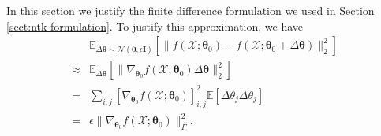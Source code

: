 \documentclass{article} %
\begin{document}
In this section we justify the finite difference formulation we used in Section \ref{sect:ntk-formulation}. To justify this approximation, we have 
\begin{align*}
& \mathbb{E}_{\Delta \boldsymbol{\theta} \sim \mathcal{N}(\textbf{0},\epsilon\textbf{I})}\left[\|f(\mathcal{X};\boldsymbol{\theta}_0)-f(\mathcal{X};\boldsymbol{\theta}_0+\Delta\boldsymbol{\theta})\|_2^2\right] \\
\approx & \mathbb{E}_{\Delta\boldsymbol{\theta}}\left[\|\nabla_{\boldsymbol{\theta}_0}f(\mathcal{X};\boldsymbol{\theta}_0)\Delta\boldsymbol{\theta}\|_2^2\right]\\
=&\sum_{i,j}\left[\nabla_{\boldsymbol{\theta}_0}f(\mathcal{X};\boldsymbol{\theta}_0)\right]_{i,j}^2\mathbb{E}\left[\Delta\theta_j\Delta\theta_j\right] \\
=& \epsilon\|\nabla_{\boldsymbol{\theta}_0}f(\mathcal{X};\boldsymbol{\theta}_0)\|_F^2 .
\end{align*}
\end{document}
